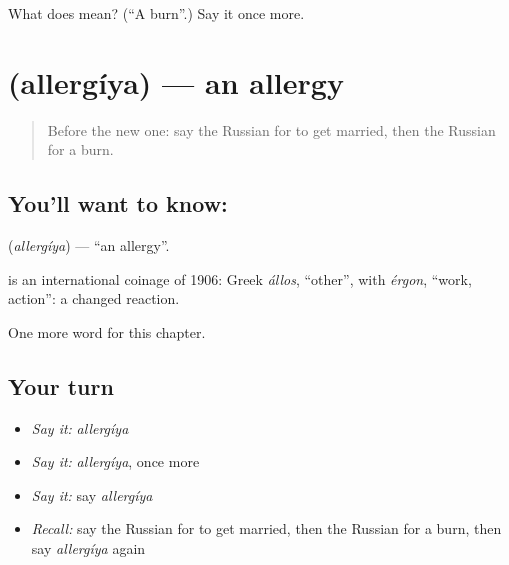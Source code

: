\begin{tcolorbox}[breakable,colback=teal!4,colframe=teal!35!black,title={Before you move on}]
What does  mean? (\textquotedblleft{}A burn\textquotedblright{}.) Say it once more.
\end{tcolorbox}
\section[\texorpdfstring{\ru{аллергия} (allergíya)}{аллергия (allergíya)}]{ (allergíya) — an allergy}

\label{lesson:RU-C210-allergiya}



\begin{quote}
Before the new one: say the Russian for to get married, then the Russian for a burn.
\end{quote}

\subsection*{You'll want to know: }
\textbf{} (\emph{allergíya}) — \textquotedblleft{}an allergy\textquotedblright{}.

\begin{cousinweb}
\textbf{} is an international coinage of 1906: Greek \emph{állos}, \textquotedblleft{}other\textquotedblright{}, with \emph{érgon}, \textquotedblleft{}work, action\textquotedblright{}: a changed reaction.
\end{cousinweb}

\begin{grammarlens}[title={What you've built}]
One more word for this chapter.
\end{grammarlens}

\subsection*{Your turn}
\begin{itemize}
\raggedright
  \item \emph{Say it:} \emph{allergíya}
  \item \emph{Say it:} \emph{allergíya}, once more
  \item \emph{Say it:} say \emph{allergíya}
  \item \emph{Recall:} say the Russian for to get married, then the Russian for a burn, then say \emph{allergíya} again
\end{itemize}

